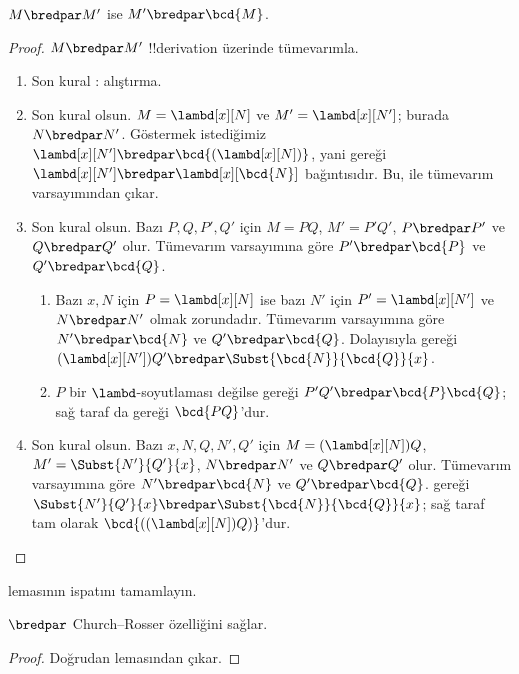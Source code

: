 \begin{lem}
  $M \bredpar M'$ ise $M' \bredpar \bcd{M}$.
\end{lem}
\begin{proof}
  $M \bredpar M'$ !!{derivation} üzerinde tümevarımla.
  \begin{enumerate}
    \item Son kural : alıştırma.
    \item Son kural  olsun. $M=\lambd[x][N]$ ve
      $M'=\lambd[x][N']$; burada $N\bredpar N'$. Göstermek istediğimiz
      $\lambd[x][N']\bredpar\bcd{(\lambd[x][N])}$, yani
       gereği
      $\lambd[x][N']\bredpar\lambd[x][\bcd{N}]$ bağıntısıdır. Bu,
       ile tümevarım varsayımından çıkar.
    \item Son kural  olsun. Bazı $P,Q,P',Q'$ için
      $M=PQ$, $M'=P'Q'$, $P\bredpar P'$ ve $Q\bredpar Q'$ olur. Tümevarım
      varsayımına göre $P'\bredpar\bcd{P}$ ve $Q'\bredpar\bcd{Q}$.
      \begin{enumerate}
        \item Bazı $x,N$ için $P=\lambd[x][N]$ ise bazı $N'$ için
          $P'=\lambd[x][N']$ ve $N\bredpar N'$ olmak zorundadır. Tümevarım
          varsayımına göre $N'\bredpar\bcd{N}$ ve $Q'\bredpar\bcd{Q}$.
          Dolayısıyla  gereği
          $(\lambd[x][N'])Q'\bredpar\Subst{\bcd{N}}{\bcd{Q}}{x}$.
        \item $P$ bir $\lambd$-soyutlaması değilse
           gereği $P'Q'\bredpar\bcd{P}\bcd{Q}$;
          sağ taraf da  gereği $\bcd{PQ}$'dur.
      \end{enumerate}
    \item Son kural  olsun. Bazı $x,N,Q,N',Q'$ için
      $M=(\lambd[x][N])Q$, $M'=\Subst{N'}{Q'}{x}$,
      $N\bredpar N'$ ve $Q\bredpar Q'$ olur. Tümevarım varsayımına göre
      $N'\bredpar\bcd{N}$ ve $Q'\bredpar\bcd{Q}$.  gereği
      $\Subst{N'}{Q'}{x}\bredpar\Subst{\bcd{N}}{\bcd{Q}}{x}$; sağ taraf
      tam olarak $\bcd{((\lambd[x][N])Q)}$'dur.
  \end{enumerate}
\end{proof}

\begin{prob}
   lemasının ispatını tamamlayın.
\end{prob}

\begin{thm}
  $\bredpar$ Church--Rosser özelliğini sağlar.
\end{thm}

\begin{proof}
  Doğrudan  lemasından çıkar.
\end{proof}


